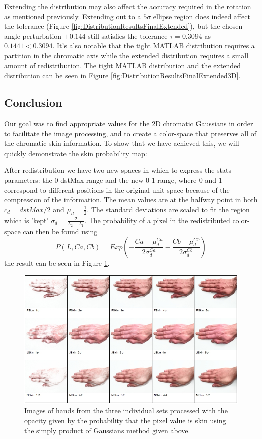 Extending the distribution may also affect the accuracy required in the rotation as mentioned previously. Extending out to a $5\sigma$ ellipse region does indeed affect the tolerance (Figure \ref{fig:DistributionResultsFinalExtended}), but the chosen angle perturbation $\pm0.144$ still satisfies the tolerance $\tau = 0.3094$ as $0.1441 < 0.3094$. It's also notable that the tight MATLAB distribution requires a partition in the chromatic axis while the extended distribution requires a small amount of redistribution. The tight MATLAB distribution and the extended distribution can be seen in Figure \ref{fig:DistributionResultsFinalExtended3D}.

\subsection{Conclusion}

Our goal was to find appropriate values for the 2D chromatic Gaussians in order to facilitate the image processing, and to create a color-space that preserves all of the chromatic skin information. To show that we have achieved this, we will quickly demonstrate the skin probability map:

After redistribution we have two new spaces in which to express the stats parameters: the 0-dstMax range and the new 0-1 range, where 0 and 1 correspond to different positions in the original unit space because of the compression of the information. The mean values are at the halfway point in both $c_d=dstMax/2$ and $\mu_d = \frac{1}{2}$.  The standard deviations are scaled to fit the region which is 'kept' $\sigma_d=\frac{\sigma}{\lambda_2-\lambda_1}$. The probability of a pixel in the redistributed color-space can then be found using 
\begin{equation}
P(L,Ca,Cb) = Exp(- \frac{Ca-\mu_d^{Ca} }{2 \sigma_d^{Ca}} - \frac{Cb-\mu_d^{Cb} }{2 \sigma_d^{Cb}})
\end{equation}
the result can be seen in Figure \ref{fig:TransformImages}.
\begin{figure}[h!]
  \centering
  \includegraphics[width=0.95 \textwidth]{Chapter3/Figs/TransformImages.jpg} 
    \caption{ Images of hands from the three individual sets processed with the opacity given by the probability that the pixel value is skin using the simply product of Gaussians method given above.}  \label{fig:TransformImages}
\end{figure}

